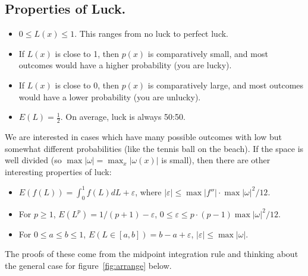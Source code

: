 \subsection{Properties of Luck.}
\begin{itemize}
\item $0 \leq L(x) \leq 1$.  This ranges from no luck to perfect luck.
\item If $L(x)$ is close to 1, then $p(x)$ is comparatively small, and most outcomes would have a higher probability (you are lucky).  
\item If $L(x)$ is close to 0, then $p(x)$ is comparatively large, and most outcomes would have a lower probability (you are unlucky).
\item $E(L)=\frac{1}{2}$.  On average, luck is always 50:50.
\end{itemize}

We are interested in cases which have many possible outcomes with low but somewhat different probabilities (like the tennis ball on the beach).  If the space is well divided (so $\max |\omega|=\max_{x}|\omega(x)|$ is small), then there are other interesting properties of luck:
\begin{itemize}
\item $E(f(L))=\int_0^1 f(L) dL+\varepsilon$, where $|\varepsilon| \leq \max|f''| \cdot \max |\omega|^2 / 12$.
\item For $p \geq 1$, $E(L^p)=1/(p+1)-\varepsilon$, $0 \leq \varepsilon \leq p \cdot (p-1) \max |\omega|^2/12$.
\item For $0 \leq a \leq b \leq 1$, $E(L \in [a,b])=b-a + \varepsilon$, $|\varepsilon| \leq \max |\omega|$.
\end{itemize}
The proofs of these come from the midpoint integration rule and thinking about the general case for figure~\ref{fig:arrange} below.

